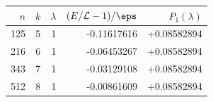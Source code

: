 \begin{tabular}{rrrrr}
\toprule
$n$&$k$&$\lambda$&$(E/\mathcal L-1)/\eps$&$P_1(\lambda)$\\
\midrule
125 & 5 & 1 & -0.11617616 & +0.08582894 \\
216 & 6 & 1 & -0.06453267 & +0.08582894 \\
343 & 7 & 1 & -0.03129108 & +0.08582894 \\
512 & 8 & 1 & -0.00861609 & +0.08582894 \\
\bottomrule
\end{tabular}
